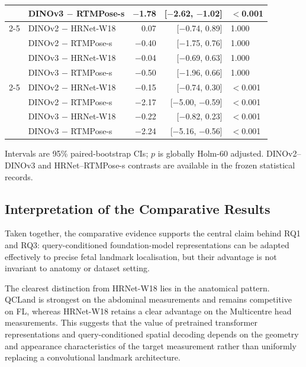 \begin{table}[htbp]
\begin{tabular}{llrrl}
      & DINOv3 $-$ RTMPose-s   & $-$1.78 & [$-$2.62, $-$1.02] & $<$0.001 \\
    \cmidrule(lr){2-5}
    \multirow{4}{*}{TAD}
      & DINOv2 $-$ HRNet-W18   & 0.07  & [$-$0.74, 0.89]       & 1.000 \\
      & DINOv2 $-$ RTMPose-s   & $-$0.40 & [$-$1.75, 0.76]    & 1.000 \\
      & DINOv3 $-$ HRNet-W18   & $-$0.04 & [$-$0.69, 0.63]    & 1.000 \\
      & DINOv3 $-$ RTMPose-s   & $-$0.50 & [$-$1.96, 0.66]    & 1.000 \\
    \cmidrule(lr){2-5}
    \multirow{4}{*}{FL}
      & DINOv2 $-$ HRNet-W18   & $-$0.15 & [$-$0.74, 0.30]    & $<$0.001 \\
      & DINOv2 $-$ RTMPose-s   & $-$2.17 & [$-$5.00, $-$0.59] & $<$0.001 \\
      & DINOv3 $-$ HRNet-W18   & $-$0.22 & [$-$0.82, 0.23]    & $<$0.001 \\
      & DINOv3 $-$ RTMPose-s   & $-$2.24 & [$-$5.16, $-$0.56] & $<$0.001 \\
    \bottomrule
  \end{tabular}
  \par\smallskip
  {\footnotesize Intervals are 95\% paired-bootstrap CIs; $p$ is
    globally Holm-60 adjusted. DINOv2--DINOv3 and HRNet--RTMPose-s
    contrasts are available in the frozen statistical records.}
\end{table}


\subsection{Interpretation of the Comparative Results}
\label{sec:discussion-comparative}
\label{sec:discussion-significance}

Taken together, the comparative evidence supports the central claim
behind RQ1 and RQ3: query-conditioned foundation-model
representations can be adapted effectively to precise fetal landmark
localisation, but their advantage is not invariant to anatomy or
dataset setting.

The clearest distinction from HRNet-W18 lies in the anatomical
pattern. QCLand is strongest on the abdominal measurements and remains
competitive on FL, whereas HRNet-W18 retains a clear advantage on the
Multicentre head measurements. This suggests that the value of
pretrained transformer representations and query-conditioned spatial
decoding depends on the geometry and appearance characteristics of the
target measurement rather than uniformly replacing a convolutional
landmark architecture.

